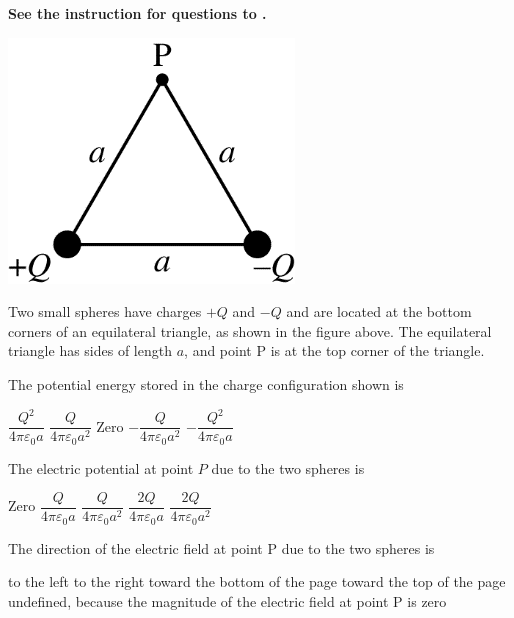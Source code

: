 
\textbf{See the instruction for questions  to .} 

\begin{center}
    \includegraphics[scale=0.3]{images/img-015-031.png}
\end{center}
    
Two small spheres have charges $+Q$ and $-Q$ and are located at the bottom corners of an equilateral triangle, as shown in the figure above. The equilateral triangle has sides of length $a$, and point P is at the top corner of the triangle.

\begin{questions}\setcounter{question}{30}\question
The potential energy stored in the charge configuration shown is

\begin{oneparchoices}
    \choice $\dfrac{Q^{2}}{4 \pi \varepsilon_{0} a}$
    \choice $\dfrac{Q}{4 \pi \varepsilon_{0} a^{2}}$
    \choice Zero
    \choice $-\dfrac{Q}{4 \pi \varepsilon_{0} a^{2}}$ 
    \choice $-\dfrac{Q^{2}}{4 \pi \varepsilon_{0} a}$
\end{oneparchoices}
\end{questions}

\begin{questions}\setcounter{question}{31}\question
The electric potential at point $P$ due to the two spheres is

\begin{oneparchoices}
    \choice Zero
    \choice $\dfrac{Q}{4 \pi \varepsilon_{0} a}$
    \choice $\dfrac{Q}{4 \pi \varepsilon_{0} a^{2}}$
    \choice $\dfrac{2 Q}{4 \pi \varepsilon_{0} a}$
    \choice $\dfrac{2 Q}{4 \pi \varepsilon_{0} a^{2}}$
\end{oneparchoices}
\end{questions}

\begin{questions}\setcounter{question}{32}\question
The direction of the electric field at point P due to the two spheres is

\begin{choices}
    \choice to the left
    \choice to the right
    \choice toward the bottom of the page
    \choice toward the top of the page
    \choice undefined, because the magnitude of the electric field at point P is zero
\end{choices}
\end{questions}
